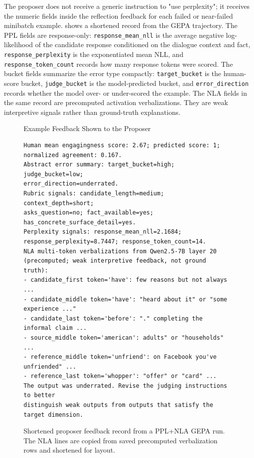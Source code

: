 \documentclass[12pt,a4paper,twoside,openright]{book}
\begin{document}
The proposer does not receive a generic instruction to "use perplexity"; it
receives the numeric fields inside the reflection feedback for each failed or
near-failed minibatch example.  shows a
shortened record from the GEPA trajectory. The PPL fields are response-only:
\texttt{response\_mean\_nll} is the average negative log-likelihood of the
candidate response conditioned on the dialogue context and fact,
\texttt{response\_perplexity} is the exponentiated mean NLL, and
\texttt{response\_token\_count} records how many response tokens were scored.
The bucket fields summarize the error type compactly: \texttt{target\_bucket}
is the human-score bucket, \texttt{judge\_bucket} is the model-predicted bucket,
and \texttt{error\_direction} records whether the model over- or under-scored
the example.
The NLA fields in the same record are precomputed activation verbalizations.
They are weak interpretive signals rather than ground-truth explanations.

\begin{figure}[!htb]
    \centering
    \begin{thesispromptbox}[width=0.98\linewidth]{Example Feedback Shown to the Proposer}
\begin{Verbatim}[fontsize=\scriptsize]
Human mean engagingness score: 2.67; predicted score: 1;
normalized agreement: 0.167.
Abstract error summary: target_bucket=high; judge_bucket=low;
error_direction=underrated.
Rubric signals: candidate_length=medium; context_depth=short;
asks_question=no; fact_available=yes; has_concrete_surface_detail=yes.
Perplexity signals: response_mean_nll=2.1684;
response_perplexity=8.7447; response_token_count=14.
NLA multi-token verbalizations from Qwen2.5-7B layer 20
(precomputed; weak interpretive feedback, not ground truth):
- candidate_first token='have': few reasons but not always ...
- candidate_middle token='have': "heard about it" or "some experience ..."
- candidate_last token='before': "." completing the informal claim ...
- source_middle token='american': adults" or "households" ...
- reference_middle token='unfriend': on Facebook you've unfriended" ...
- reference_last token='whopper': "offer" or "card" ...
The output was underrated. Revise the judging instructions to better
distinguish weak outputs from outputs that satisfy the target dimension.
\end{Verbatim}
    \end{thesispromptbox}
    \caption{Shortened proposer feedback record from a PPL+NLA GEPA run. The
    NLA lines are copied from saved precomputed verbalization rows and shortened
    for layout.}
    \label{fig:proposer-feedback-example}
\end{figure}
\end{document}
